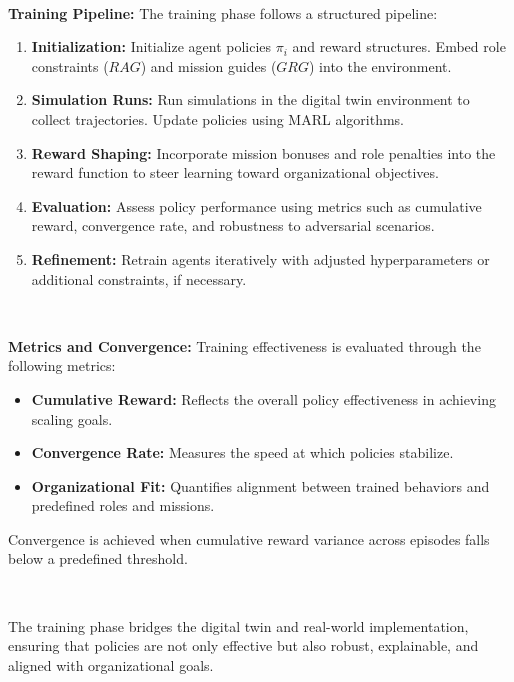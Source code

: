 \documentclass[conference]{IEEEtran}
\begin{document}
\

\noindent\textbf{Training Pipeline:} 
The training phase follows a structured pipeline:
\begin{enumerate}
    \item \textbf{Initialization:} Initialize agent policies $\pi_i$ and reward structures. Embed role constraints ($RAG$) and mission guides ($GRG$) into the environment.
    \item \textbf{Simulation Runs:} Run simulations in the digital twin environment to collect trajectories. Update policies using MARL algorithms.
    \item \textbf{Reward Shaping:} Incorporate mission bonuses and role penalties into the reward function to steer learning toward organizational objectives.
    \item \textbf{Evaluation:} Assess policy performance using metrics such as cumulative reward, convergence rate, and robustness to adversarial scenarios.
    \item \textbf{Refinement:} Retrain agents iteratively with adjusted hyperparameters or additional constraints, if necessary.
\end{enumerate}

\

\noindent\textbf{Metrics and Convergence:} 
Training effectiveness is evaluated through the following metrics:
\begin{itemize}
    \item \textbf{Cumulative Reward:} Reflects the overall policy effectiveness in achieving scaling goals.
    \item \textbf{Convergence Rate:} Measures the speed at which policies stabilize.
    \item \textbf{Organizational Fit:} Quantifies alignment between trained behaviors and predefined roles and missions.
\end{itemize}
Convergence is achieved when cumulative reward variance across episodes falls below a predefined threshold.

\

The training phase bridges the digital twin and real-world implementation, ensuring that policies are not only effective but also robust, explainable, and aligned with organizational goals.
\end{document}
